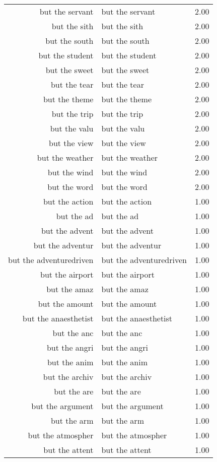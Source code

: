 \begin{table}[ht]
\begin{tabular}{rlr}
  but the servant & but the servant & 2.00 \\ 
  but the sith & but the sith & 2.00 \\ 
  but the south & but the south & 2.00 \\ 
  but the student & but the student & 2.00 \\ 
  but the sweet & but the sweet & 2.00 \\ 
  but the tear & but the tear & 2.00 \\ 
  but the theme & but the theme & 2.00 \\ 
  but the trip & but the trip & 2.00 \\ 
  but the valu & but the valu & 2.00 \\ 
  but the view & but the view & 2.00 \\ 
  but the weather & but the weather & 2.00 \\ 
  but the wind & but the wind & 2.00 \\ 
  but the word & but the word & 2.00 \\ 
  but the action & but the action & 1.00 \\ 
  but the ad & but the ad & 1.00 \\ 
  but the advent & but the advent & 1.00 \\ 
  but the adventur & but the adventur & 1.00 \\ 
  but the adventuredriven & but the adventuredriven & 1.00 \\ 
  but the airport & but the airport & 1.00 \\ 
  but the amaz & but the amaz & 1.00 \\ 
  but the amount & but the amount & 1.00 \\ 
  but the anaesthetist & but the anaesthetist & 1.00 \\ 
  but the anc & but the anc & 1.00 \\ 
  but the angri & but the angri & 1.00 \\ 
  but the anim & but the anim & 1.00 \\ 
  but the archiv & but the archiv & 1.00 \\ 
  but the are & but the are & 1.00 \\ 
  but the argument & but the argument & 1.00 \\ 
  but the arm & but the arm & 1.00 \\ 
  but the atmospher & but the atmospher & 1.00 \\ 
  but the attent & but the attent & 1.00 \\ 

\end{tabular}
\end{table}
